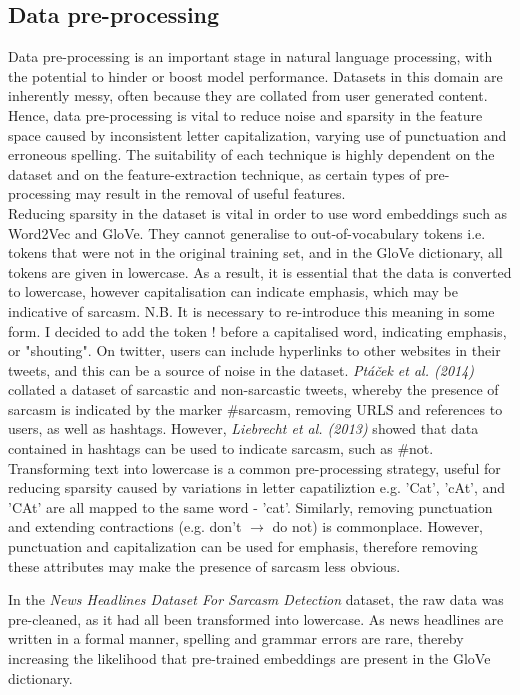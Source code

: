 \documentclass[12pt,a4paper]{article}
\begin{document}
\subsection{Data pre-processing}
\noindent Data pre-processing is an important stage in natural language processing, with the potential to hinder or boost model performance. Datasets in this domain are inherently messy, often because they are collated from user generated content. Hence, data pre-processing is vital to reduce noise and sparsity in the feature space caused by inconsistent letter capitalization, varying use of punctuation and erroneous spelling. The suitability of each technique is highly dependent on the dataset and on the feature-extraction technique, as certain types of pre-processing may result in the removal of useful features. \\

Reducing sparsity in the dataset is vital in order to use word embeddings such as Word2Vec and GloVe. They cannot generalise to out-of-vocabulary tokens i.e. tokens that were not in the original training set, and in the GloVe dictionary, all tokens are given in lowercase. As a result, it is essential that the data is converted to lowercase, however capitalisation can indicate emphasis, which may be indicative of sarcasm. N.B. It is necessary to re-introduce this meaning in some form. I decided to add the token ! before a capitalised word, indicating emphasis, or "shouting". On twitter, users can include hyperlinks to other websites in their tweets, and this can be a source of noise in the dataset. \textit{Pt{\'a}{\v{c}ek et al. (2014)}} \cite{ptavcek2014sarcasm} collated a dataset of sarcastic and non-sarcastic tweets, whereby the presence of sarcasm is indicated by the marker \#sarcasm, removing URLS and references to users, as well as hashtags. However, \textit{Liebrecht et al. (2013)} \cite{liebrecht2013perfect} showed that data contained in hashtags can be used to indicate sarcasm, such as \#not. Transforming text into lowercase is a common pre-processing strategy, useful for reducing sparsity caused by variations in letter capatiliztion e.g. 'Cat', 'cAt', and 'CAt' are all mapped to the same word - 'cat'. Similarly, removing punctuation and extending contractions (e.g. don't $\rightarrow$ do not) is commonplace. However, punctuation and capitalization can be used for emphasis, therefore removing these attributes may make the presence of sarcasm less obvious.

In the \textit{News Headlines Dataset For Sarcasm Detection} dataset, the raw data was pre-cleaned, as it had all been transformed into lowercase. As news headlines are written in a formal manner, spelling and grammar errors are rare, thereby increasing the likelihood that pre-trained embeddings are present in the GloVe dictionary.
\end{document}
